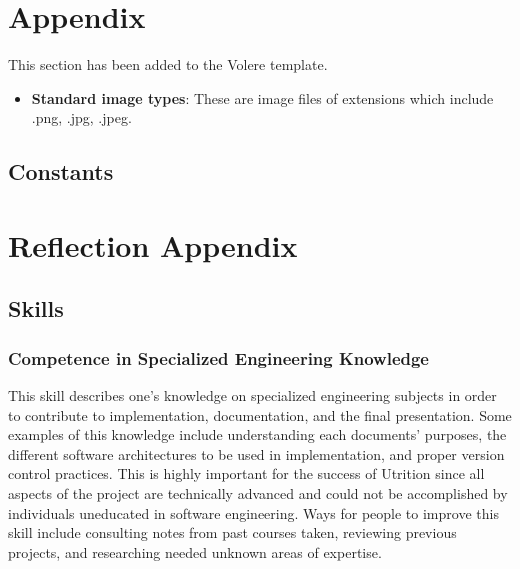 \documentclass[12pt]{article}
\begin{document}
\noindent {}

\section{Appendix}
This section has been added to the Volere template.
\begin{itemize}
	\item \textbf{Standard image types}: These are image files of extensions which include .png, .jpg, .jpeg.
\end{itemize}

\subsection{Constants}

\section{Reflection Appendix}
\subsection{Skills}
\subsubsection{Competence in Specialized Engineering Knowledge}
This skill describes one's knowledge on specialized engineering subjects in order to contribute to implementation, documentation, and the final presentation. Some examples of this knowledge include understanding each documents' purposes, the different software architectures to be used in implementation, and proper version control practices. This is highly important for the success of Utrition since all aspects of the project are technically advanced and could not be accomplished by individuals uneducated in software engineering. Ways for people to improve this skill include consulting notes from past courses taken, reviewing previous projects, and researching needed unknown areas of expertise.
\end{document}
